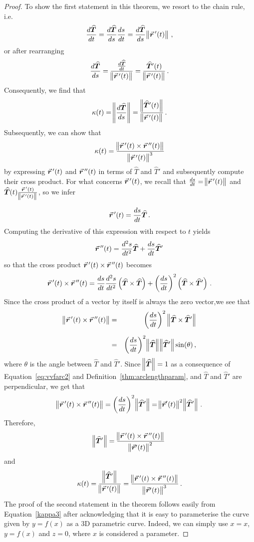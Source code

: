 \begin{proof}


To show the first statement in this theorem, we resort to the chain rule, i.e.
$$
\frac{d\widehat T}{dt} = \frac{d\widehat T}{ds}\frac{ds}{dt}= \frac{d\widehat T}{ds}\norm{\vrp(t)}\,,
$$
or after rearranging
$$
\frac{d\widehat T}{ds}=\dfrac{\frac{d\widehat T}{dt}}{\norm{\vrp(t)}}=\frac{\widehat T'(t)}{\norm{\vrp(t)}}\,.
$$
Consequently, we find that
$$
\kappa(t)=\norm{\dfrac{d\widehat{T}}{ds}}=\frac{\norm{\widehat T'(t)}}{\norm{\vrp(t)}}\,.
$$
Subsequently, we can show that
$$
\kappa(t) = \frac{\norm{\vrp(t)\times\vrp'(t)}}{\norm{\vrp(t)}^3} 
$$
by expressing $\vrp(t)$ and $\vrp'(t)$ in terms of $\widehat{T}$ and $\widehat{T}'$ and subsequently compute their cross product. For what concerns $\vrp(t)$, we recall that $\frac{ds}{dt}=\norm{\vrp(t)}$ and $ \widehat T(t) \frac{\vrp(t)}{\norm{\vrp(t)}}$, so we infer

$$\vrp(t)=\frac{ds}{dt}\widehat{T}\,.$$
Computing the derivative of this expression with respect to $t$ yields
$$
\vrp'(t)=\frac{d^2s}{dt^2}\widehat{T}+\frac{ds}{dt}\widehat{T}'\, 
$$
so that the cross product $\vrp(t)\times\vrp'(t)$ becomes
$$
\vrp(t)\times\vrp'(t)=\frac{ds}{dt}\frac{d^2s}{dt^2}\left(\widehat{T}\times\widehat{T}\right)+\left(\frac{ds}{dt}\right)^2\left(\widehat{T}\times\widehat{T}'\right)\,.
$$
Since the cross product of a vector by itself is always the zero vector,we see that
\begin{eqnarray*}
\norm{\vrp(t)\times\vrp'(t)}&=&\left(\frac{ds}{dt}\right)^2\left\|\widehat{T}\times\widehat{T}'\right\|\\[0.2cm]
&=&\left(\frac{ds}{dt}\right)^2\norm{\widehat{T}}\norm{\widehat{T}'}\sin(\theta)\,,
\end{eqnarray*}
where $\theta$ is the angle between $\widehat{T}$ and $\widehat{T}'$. Since $\norm{\widehat{T}}=1$ as a consequence of Equation~\eqref{eq:vvfarc2} and Definition~\ref{thm:arclengthparam}, and $\widehat{T}$ and $\widehat{T}'$ are perpendicular, we get that 
$$
\norm{\vrp(t)\times\vrp'(t)}=\left(\frac{ds}{dt}\right)^2\norm{\widehat{T}'}=\norm{\vec{r}'(t)}^2\norm{\widehat{T}'}\,.
$$
Therefore,
$$
\norm{\widehat{T}'}=\dfrac{\norm{\vrp(t)\times\vrp'(t)}}{\norm{\vec{r}'(t)}^2}\,
$$
and
\begin{equation}
\kappa(t)=\frac{\norm{\widehat T'}}{\norm{\vrp(t)}}=\dfrac{\norm{\vrp(t)\times\vrp'(t)}}{\norm{\vec{r}'(t)}^3}\,.
\label{kappa3}
\end{equation}
The proof of the second statement in the theorem follows easily from Equation~\eqref{kappa3} after acknowledging that it is easy to parameterise the curve given by $y=f(x)$ as a 3D parametric curve. Indeed, 
we can simply use $x=x$, $y=f(x)$ and $z=0$, where $x$ is considered a parameter. 


\end{proof}
